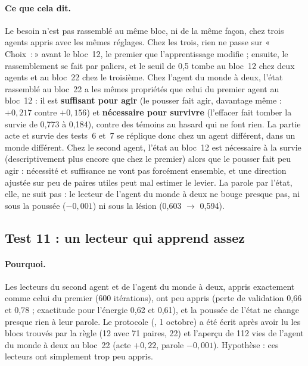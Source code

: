 \documentclass[11pt,a4paper]{article}
\newcommand{\Choix}{«\,Choix~:\,»}
\newcommand{\code}[1]{\texttt{\detokenize{#1}}}
\begin{document}
\paragraph{Ce que cela dit.} Le besoin n'est pas rassemblé au même bloc, ni de la
même façon, chez trois agents appris avec les mêmes réglages. Chez les trois, rien
ne passe sur \Choix{} avant le bloc~12, le premier que l'apprentissage modifie ;
ensuite, le rassemblement se fait par paliers, et le seuil de 0,5 tombe au
bloc~12 chez deux agents et au bloc~22 chez le troisième. Chez l'agent du monde à
deux, l'état rassemblé au bloc~22 a les mêmes propriétés que celui du premier agent
au bloc~12 : il est \textbf{suffisant pour agir} (le pousser fait agir, davantage
même : $+0,217$ contre $+0,156$) et \textbf{nécessaire pour survivre} (l'effacer fait
tomber la survie de 0,773 à 0,184), contre des témoins au hasard qui ne font rien. La
partie acte et survie des tests~6 et~7 se réplique donc chez un agent différent,
dans un monde différent. Chez le second agent, l'état au bloc~12 est nécessaire à la
survie (descriptivement plus encore que chez le premier) alors que le pousser fait
peu agir : nécessité et suffisance ne vont pas forcément ensemble, et une direction
ajustée sur peu de paires utiles peut mal estimer le levier. La parole par l'état,
elle, ne suit pas : le lecteur de l'agent du monde à deux ne bouge presque pas, ni
sous la poussée ($-0,001$) ni sous la lésion (0,603 $\to$ 0,594).

\subsection{Test 11 : un lecteur qui apprend assez}
\label{sec-t11}

\paragraph{Pourquoi.} Les lecteurs du second agent et de l'agent du monde à deux,
appris exactement comme celui du premier (600 itérations), ont peu appris (perte
de validation 0,66 et 0,78 ; exactitude pour l'énergie 0,62 et 0,61), et la
poussée de l'état ne change presque rien à leur parole. Le protocole
(\code{0a28560}, 1\ier{} octobre) a été écrit après avoir lu les blocs trouvés par
la règle (12 avec 71 paires, 22) et l'aperçu de 112 vies de l'agent du monde à
deux au bloc~22 (acte $+0,22$, parole $-0,001$). Hypothèse : ces lecteurs ont
simplement trop peu appris.
\end{document}
